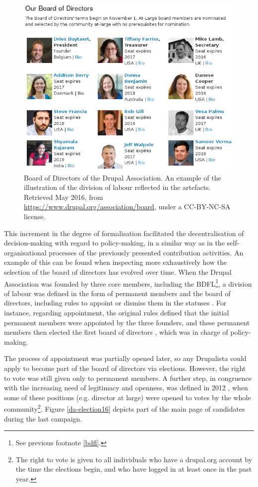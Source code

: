 \begin{figure}[H]
\centering
\includegraphics[scale=0.6]{img/offline/BoD2}
\caption[Board of Directors of the Drupal Association]%
{Board of Directors of the Drupal Association. An example of the illustration of the division of labour reflected in the artefacts. Retrieved  May 2016, from \url{https://www.drupal.org/association/board}, under a CC-BY-NC-SA license.}
\label{bod}
\end{figure}

This increment in the degree of formalisation facilitated the decentralisation of decision-making with regard to policy-making, in a similar way as in the self-organisational processes of the previously presented contribution activities.  An example of this can be found when inspecting more exhaustively how the selection of the board of directors has evolved over time. When the Drupal Association was founded by three core members, including the BDFL\footnote{See previous footnote \ref{bdfl}.}, a division of labour was defined in the form of permanent members and the board of directors, including rules to appoint or dismiss them in the statuses \parencite{drupal-vzw-statuses:2016:Online}. For instance, regarding appointment, the original rules defined that the initial permanent members were appointed by the three founders, and these permanent members then elected the first board of directors \parencite{da-history:2016:Online}, which was in charge of policy-making.

The process of appointment was partially opened later, so any Drupalista could apply to become part of the board of directors via elections. However, the right to vote was still given only to permanent members. A further step, in congruence with the increasing need of legitimacy and openness, was defined in 2012 \parencite{drupal-elections:2016:Online}, when some of these positions (e.g. director at large) were opened to votes by the whole community\footnote{The right to vote is given to all individuals who have a drupal.org account by the time the elections begin, and who have logged in at least once in the past year.}. Figure \ref{da-election16} depicts part of the main page of candidates during the last campaign.

